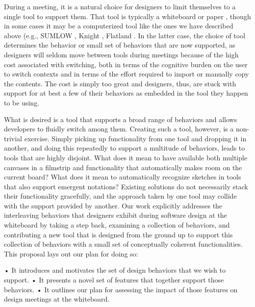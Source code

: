 During a meeting, it is a natural choice for designers to limit themselves to a single tool to support them. That tool is typically a whiteboard or paper \cite{petre2009insights}, though in some cases it may be a computerized tool like the ones we have described above (e.g., SUMLOW \cite{chen2008sumlow}, Knight \cite{damm2000tool}, Flatland \cite{mynatt1999flatland}. In the latter case, the choice of tool determines the behavior or small set of behaviors that are now supported, as designers will seldom move between tools during meetings because of the high cost associated with switching, both in terms of the cognitive burden on the user to switch contexts and in terms of the effort required to import or manually copy the contents. The cost is simply too great and designers, thus, are stuck with support for at best a few of their behaviors as embedded in the tool they happen to be using.

What is desired is a tool that supports a broad range of behaviors and allows developers to fluidly switch among them. Creating such a tool, however, is a non-trivial exercise. Simply picking up functionality from one tool and dropping it in another, and doing this repeatedly to support a multitude of behaviors, leads to tools that are highly disjoint. What does it mean to have available both multiple canvases in a filmstrip and functionality that automatically makes room on the current board?  What does it mean to automatically recognize sketches in tools that also support emergent notations? Existing solutions do not necessarily stack their functionality gracefully, and the approach taken by one tool may collide with the support provided by another.
Our work explicitly addresses the interleaving behaviors that designers exhibit during software design at the whiteboard by taking a step back, examining a collection of behaviors, and contributing a new tool that is designed from the ground up to support this collection of behaviors with a small set of conceptually coherent functionalities.  This proposal lays out our plan for doing so:

•	It introduces and motivates the set of design behaviors that we wish to support.
•	It presents a novel set of features that together support those behaviors.
•	It outlines our plan for assessing the impact of those features on design meetings at the whiteboard. 



